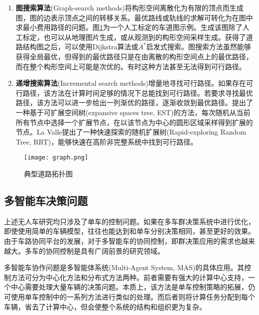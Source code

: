 \begin{enumerate}[wide=\parindent]
\begin{enumerate}[label=(\arabic*),wide=\parindent]
\item \textbf{图搜索算法}(Graph-search methods)将构形空间离散化为有限的顶点而生成图，图的边表示顶点之间的转移关系。最优路线或轨线的求解可转化为在图中求最小费用路径的问题。图\ref{fig:graph}为一个人工标定的车道图示例。生成该图除了人工标定，也可以从地理图片生成\cite{Backer2007Finding,Wang1996Approximation}，或从观测到的构形空间采样生成\cite{Lavalle1999Rapidly,Glassman2010A}。获得了道路结构图之后，可以使用Dijkstra算法\cite{Dijkstra1959A}或$A^*$启发式搜索\cite{Hart2010A}。图搜索方法虽然能够获得全局最优，但得到的最优路径只是在由离散的构形空间点上的最优路径，而在整个构形空间上可能是次优的。有时这种方法甚至无法得到可行路径。

\item \textbf{递增搜索算法}(Incremental search methods)增量地寻找可行路径。如果存在可行路径，该方法在计算时间足够的情况下总能找到可行路径。若要求寻找最优路径，该方法可以进一步给出一列渐优的路径，逐渐收敛到最优路径。提出了一种基于可扩展空间树(expansive spaces tree, EST)的方法，每次随机从当前所有节点中选择一个扩展节点，在以该节点为中心的圆形区域采样得到扩展的节点。La Valle\cite{Lavalle1999Rapidly}提出了一种快速探索的随机扩展树(Rapid-exploring Random Tree, RRT)，能够快速在高阶非完整系统中找到可行路径。

\end{enumerate}

\begin{figure}[htbp]
\centering
\texttt{[image: graph.png]}
\caption{典型道路拓扑图}
\label{fig:graph}
\end{figure}
\end{enumerate}

\subsection{多智能车决策问题}
\label{sec:multi}
上述无人车研究均只涉及了单车的控制问题。如果在多车群决策系统中进行优化，即使使用简单的车辆模型，往往也能达到和单车分别决策相同，甚至更好的效果\cite{Cao2012An}。由于车路协同平台的发展，对于多智能车的协同控制，即群决策应用的需求也越来越大。多车的协同控制是具有广阔前景的研究领域。

多智能车协作问题是多智能体系统(Multi-Agent System, MAS)的具体应用。其控制方法可分为中心化方法和分布式方法两种。前者需要有强大的计算中心支持，一个中心需要处理大量车辆的决策问题。本质上，该方法是单车控制策略的拓展，仍可使用单车控制中的一系列方法进行类似的处理。而后者则将计算任务分配到每个车辆，省去了计算中心，但会使整个系统的结构和组织更为复杂。

